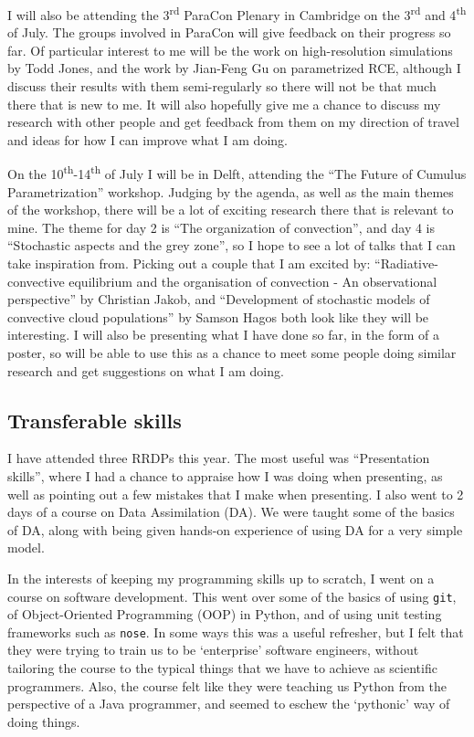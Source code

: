 \documentclass[11pt,a4paper]{article}
\newcommand{\ts}{\textsuperscript}
\begin{document}
I will also be attending the 3\ts{rd} ParaCon Plenary in Cambridge on the 3\ts{rd} and 4\ts{th} of July. The groups involved in ParaCon will give feedback on their progress so far. Of particular interest to me will be the work on high-resolution simulations by Todd Jones, and the work by Jian-Feng Gu on parametrized RCE, although I discuss their results with them semi-regularly so there will not be that much there that is new to me. It will also hopefully give me a chance to discuss my research with other people and get feedback from them on my direction of travel and ideas for how I can improve what I am doing.

On the 10\ts{th}-14\ts{th} of July I will be in Delft, attending the ``The Future of Cumulus Parametrization'' workshop. Judging by the agenda, as well as the main themes of the workshop, there will be a lot of exciting research there that is relevant to mine. The theme for day 2 is ``The organization of convection'', and day 4 is ``Stochastic aspects and the grey zone'', so I hope to see a lot of talks that I can take inspiration from. Picking out a couple that I am excited by: ``Radiative-convective equilibrium and the organisation of convection - An observational perspective'' by Christian Jakob, and ``Development of stochastic models of convective cloud populations'' by Samson Hagos both look like they will be interesting. I will also be presenting what I have done so far, in the form of a poster, so will be able to use this as a chance to meet some people doing similar research and get suggestions on what I am doing.

\subsection{Transferable skills}

I have attended three RRDPs this year. The most useful was ``Presentation skills'', where I had a chance to appraise how I was doing when presenting, as well as pointing out a few mistakes that I make when presenting. I also went to 2 days of a course on Data Assimilation (DA). We were taught some of the basics of DA, along with being given hands-on experience of using DA for a very simple model.

In the interests of keeping my programming skills up to scratch, I went on a course on software development. This went over some of the basics of using \texttt{git}, of Object-Oriented Programming (OOP) in Python, and of using unit testing frameworks such as \texttt{nose}. In some ways this was a useful refresher, but I felt that they were trying to train us to be `enterprise' software engineers, without tailoring the course to the typical things that we have to achieve as scientific programmers. Also, the course felt like they were teaching us Python from the perspective of a Java programmer, and seemed to eschew the `pythonic' way of doing things.
\end{document}
